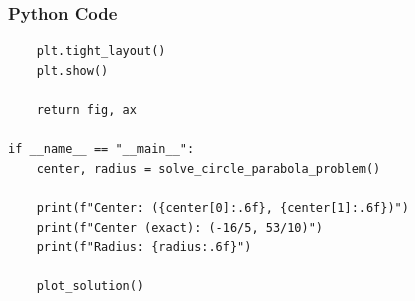\documentclass{beamer}
\numberwithin{equation}{section}
\begin{document}
\begin{frame}[fragile]
    \frametitle{Python Code}
    \begin{lstlisting}
    plt.tight_layout()
    plt.show()
    
    return fig, ax

if __name__ == "__main__":
    center, radius = solve_circle_parabola_problem()
    
    print(f"Center: ({center[0]:.6f}, {center[1]:.6f})")
    print(f"Center (exact): (-16/5, 53/10)")
    print(f"Radius: {radius:.6f}")
    
    plot_solution()

\end{lstlisting}
\end{frame}
\end{document}

